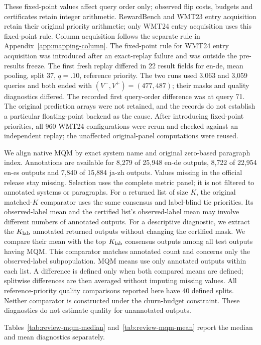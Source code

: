 These fixed-point values affect query order only; observed flip costs, budgets and certificates retain integer arithmetic. RewardBench and WMT23 entry acquisition retain their original priority arithmetic; only WMT24 entry acquisition uses this fixed-point rule. Column acquisition follows the separate rule in Appendix~\ref{app:mapping-column}. The fixed-point rule for WMT24 entry acquisition was introduced after an exact-replay failure and was outside the pre-results freeze. The first fresh replay differed in 22 result fields for en-de, mean pooling, split 37, $q=.10$, reference priority. The two runs used 3,063 and 3,059 queries and both ended with $(V^-,V^+)=(477,487)$; their masks and quality diagnostics differed. The recorded first query-order difference was at query 71. The original prediction arrays were not retained, and the records do not establish a particular floating-point backend as the cause. After introducing fixed-point priorities, all 960 WMT24 configurations were rerun and checked against an independent replay; the unaffected original-panel computations were reused.

We align native MQM by exact system name and original zero-based paragraph index. Annotations are available for 8,279 of 25,948 en-de outputs, 8,722 of 22,954 en-es outputs and 7,840 of 15,884 ja-zh outputs. Values missing in the official release stay missing. Selection uses the complete metric panel; it is not filtered to annotated systems or paragraphs. For a returned list of size $K$, the original matched-$K$ comparator uses the same consensus and label-blind tie priorities. Its observed-label mean and the certified list's observed-label mean may involve different numbers of annotated outputs. For a descriptive diagnostic, we extract the $K_{\rm lab}$ annotated returned outputs without changing the certified mask. We compare their mean with the top $K_{\rm lab}$ consensus outputs among all test outputs having MQM. This comparator matches annotated count and concerns only the observed-label subpopulation. MQM means use only annotated outputs within each list. A difference is defined only when both compared means are defined; splitwise differences are then averaged without imputing missing values. All reference-priority quality comparisons reported here have 40 defined splits. Neither comparator is constructed under the churn-budget constraint. These diagnostics do not estimate quality for unannotated outputs.

Tables~\ref{tab:review-mqm-median} and~\ref{tab:review-mqm-mean} report the median and mean diagnostics separately.



